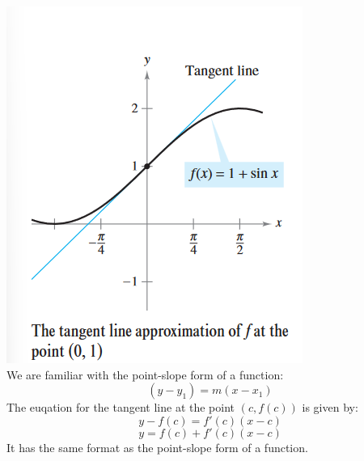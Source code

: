 \documentclass[11pt]{article}
\begin{document}
\includegraphics{3.9.png}\\
We are familiar with the point-slope form of a function:
\[(y-y_1)=m(x-x_1)\]
The euqation for the tangent line at the point $(c, f(c))$ is given by:
\[y-f(c)=f'(c)(x-c)\]
\[y=f(c)+f'(c)(x-c)\]
It has the same format as the point-slope form of a function.\\
\end{document}

